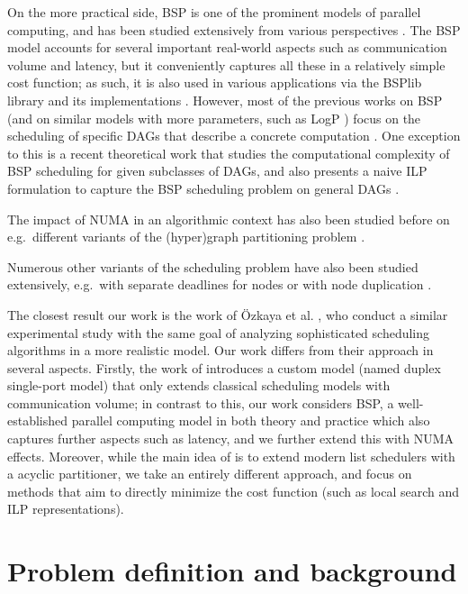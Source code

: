 \documentclass[sigconf,nonacm]{acmart}
\begin{document}
On the more practical side, BSP is one of the prominent models of parallel computing, and has been studied extensively from various perspectives \cite{BSPintro, BSPbook1, BSPbook2, BSPqa, multiBSP2}. The BSP model accounts for several important real-world aspects such as communication volume and latency, but it conveniently captures all these in a relatively simple cost function; as such, it is also used in various applications via the BSPlib library and its implementations \cite{BSPlib, BSPimpl1, BSPimpl2}. However, most of the previous works on BSP (and on similar models with more parameters, such as LogP \cite{logP}) focus on the scheduling of specific DAGs that describe a concrete computation \cite{BSPalg1, BSPalg2, BSPalg3}. One exception to this is a recent theoretical work that studies the computational complexity of BSP scheduling for given subclasses of DAGs, and also presents a naive ILP formulation to capture the BSP scheduling problem on general DAGs \cite{DAGBSP}.

The impact of NUMA in an algorithmic context has also been studied before on e.g.\ different variants of the (hyper)graph partitioning problem \cite{hier1, multi3, hyperDAG}.

Numerous other variants of the scheduling problem have also been studied extensively, e.g.\ with separate deadlines for nodes or with node duplication \cite{tardiness, duplic}.

The closest result our work is the work of Özkaya et al. \cite{SPD}, who conduct a similar experimental study with the same goal of analyzing sophisticated scheduling algorithms in a more realistic model. Our work differs from their approach in several aspects. Firstly, the work of \cite{SPD} introduces a custom model (named duplex single-port model) that only extends classical scheduling models with communication volume; in contrast to this, our work considers BSP, a well-established parallel computing model in both theory and practice which also captures further aspects such as latency, and we further extend this with NUMA effects. Moreover, while the main idea of \cite{SPD} is to extend modern list schedulers with a acyclic partitioner, we take an entirely different approach, and focus on methods that aim to directly minimize the cost function (such as local search and ILP representations).

\section{Problem definition and background}
\end{document}
